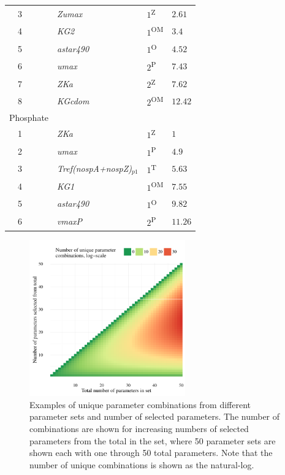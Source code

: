 \documentclass[letterpaper,12pt,oneside]{article}\usepackage[]{graphicx}\usepackage[]{color}
\begin{document}
\begin{table}[!tbp]
{\begin{center}
\begin{tabular}{llll}
~~3&\footnotesize{\textit{Zumax}}&$1$\textsuperscript{Z}&$2.61$\tabularnewline
~~4&\footnotesize{\textit{KG2}}&$1$\textsuperscript{OM}&$3.4$\tabularnewline
~~5&\footnotesize{\textit{astar490}}&$1$\textsuperscript{O}&$4.52$\tabularnewline
~~6&\footnotesize{\textit{umax}}&$2$\textsuperscript{P}&$7.43$\tabularnewline
~~7&\footnotesize{\textit{ZKa}}&$2$\textsuperscript{Z}&$7.62$\tabularnewline
~~8&\footnotesize{\textit{KGcdom}}&$2$\textsuperscript{OM}&$12.42$\tabularnewline
\hline
{Phosphate}&&&\tabularnewline
~~1&\footnotesize{\textit{ZKa}}&$1$\textsuperscript{Z}&$1$\tabularnewline
~~2&\footnotesize{\textit{umax}}&$1$\textsuperscript{P}&$4.9$\tabularnewline
~~3&\footnotesize{\textit{Tref(nospA+nospZ)$_{p1}$}}&$1$\textsuperscript{T}&$5.63$\tabularnewline
~~4&\footnotesize{\textit{KG1}}&$1$\textsuperscript{OM}&$7.55$\tabularnewline
~~5&\footnotesize{\textit{astar490}}&$1$\textsuperscript{O}&$9.82$\tabularnewline
~~6&\footnotesize{\textit{vmaxP}}&$2$\textsuperscript{P}&$11.26$\tabularnewline
\hline
\end{tabular}\end{center}}

\end{table}



\clearpage


\begin{figure}[!ht]

{\centering \includegraphics[width=0.6\textwidth]{figs/combnex-1} 

}

\caption[Examples of unique parameter combinations from different parameter sets and number of selected parameters]{Examples of unique parameter combinations from different parameter sets and number of selected parameters.  The number of combinations are shown for increasing numbers of selected parameters from the total in the set, where 50 parameter sets are shown each with one through 50 total parameters. Note that the number of unique combinations is shown as the natural-log.}\label{fig:combnex}
\end{figure}
\end{document}
